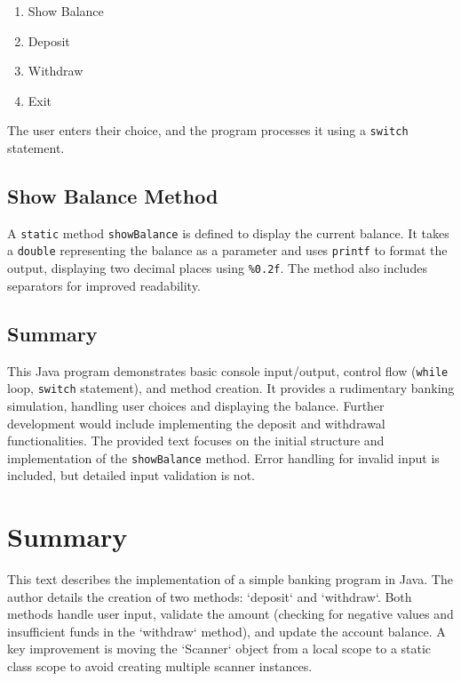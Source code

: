 \documentclass{article}
\begin{document}
\begin{enumerate}
    \item Show Balance
    \item Deposit
    \item Withdraw
    \item Exit
\end{enumerate}

The user enters their choice, and the program processes it using a \texttt{switch} statement.

\subsection{Show Balance Method}

A \texttt{static} method \texttt{showBalance} is defined to display the current balance.  It takes a \texttt{double} representing the balance as a parameter and uses \texttt{printf} to format the output, displaying two decimal places using \texttt{\%0.2f}.  The method also includes separators for improved readability.

\subsection{Summary}

This Java program demonstrates basic console input/output, control flow (\texttt{while} loop, \texttt{switch} statement), and method creation. It provides a rudimentary banking simulation, handling user choices and displaying the balance.  Further development would include implementing the deposit and withdrawal functionalities.  The provided text focuses on the initial structure and implementation of the \texttt{showBalance} method.  Error handling for invalid input is included, but detailed input validation is not.


\section{Summary}

This text describes the implementation of a simple banking program in Java.  The author details the creation of two methods: `deposit` and `withdraw`.  Both methods handle user input, validate the amount (checking for negative values and insufficient funds in the `withdraw` method), and update the account balance.  A key improvement is moving the `Scanner` object from a local scope to a static class scope to avoid creating multiple scanner instances.
\end{document}
